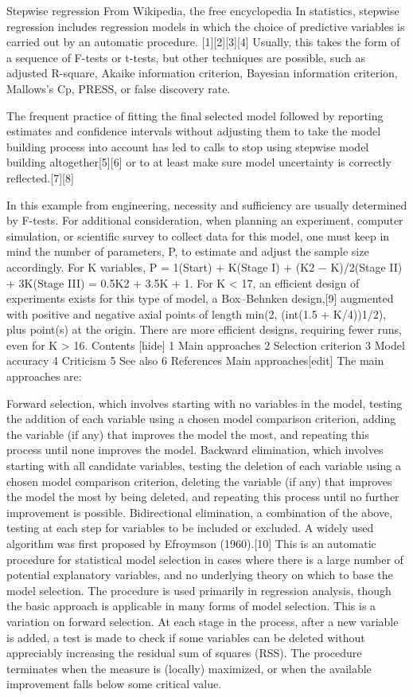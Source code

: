 Stepwise regression
From Wikipedia, the free encyclopedia
In statistics, stepwise regression includes regression models in which the choice of predictive variables is carried out by an automatic procedure. [1][2][3][4] Usually, this takes the form of a sequence of F-tests or t-tests, but other techniques are possible, such as adjusted R-square, Akaike information criterion, Bayesian information criterion, Mallows's Cp, PRESS, or false discovery rate.

The frequent practice of fitting the final selected model followed by reporting estimates and confidence intervals without adjusting them to take the model building process into account has led to calls to stop using stepwise model building altogether[5][6] or to at least make sure model uncertainty is correctly reflected.[7][8]


In this example from engineering, necessity and sufficiency are usually determined by F-tests. For additional consideration, when planning an experiment, computer simulation, or scientific survey to collect data for this model, one must keep in mind the number of parameters, P, to estimate and adjust the sample size accordingly. For K variables, P = 1(Start) + K(Stage I) + (K2 − K)/2(Stage II) + 3K(Stage III) = 0.5K2 + 3.5K + 1. For K < 17, an efficient design of experiments exists for this type of model, a Box–Behnken design,[9] augmented with positive and negative axial points of length min(2, (int(1.5 + K/4))1/2), plus point(s) at the origin. There are more efficient designs, requiring fewer runs, even for K > 16.
Contents  [hide] 
1 Main approaches
2 Selection criterion
3 Model accuracy
4 Criticism
5 See also
6 References
Main approaches[edit]
The main approaches are:

Forward selection, which involves starting with no variables in the model, testing the addition of each variable using a chosen model comparison criterion, adding the variable (if any) that improves the model the most, and repeating this process until none improves the model.
Backward elimination, which involves starting with all candidate variables, testing the deletion of each variable using a chosen model comparison criterion, deleting the variable (if any) that improves the model the most by being deleted, and repeating this process until no further improvement is possible.
Bidirectional elimination, a combination of the above, testing at each step for variables to be included or excluded.
A widely used algorithm was first proposed by Efroymson (1960).[10] This is an automatic procedure for statistical model selection in cases where there is a large number of potential explanatory variables, and no underlying theory on which to base the model selection. The procedure is used primarily in regression analysis, though the basic approach is applicable in many forms of model selection. This is a variation on forward selection. At each stage in the process, after a new variable is added, a test is made to check if some variables can be deleted without appreciably increasing the residual sum of squares (RSS). The procedure terminates when the measure is (locally) maximized, or when the available improvement falls below some critical value.

